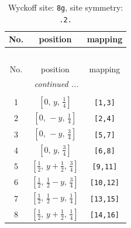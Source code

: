 \documentclass[fleqn,8pt]{jsarticle}
\begin{document}
\begin{longtable}{ccc}
\caption{Wyckoff site: {\tt 8g}, site symmetry: {\tt .2.}}
 \\
 \hline \hline
No. & position & mapping \\ \hline \endfirsthead

\multicolumn{2}{l}{\tablename\ \thetable{}} \\
 \hline \hline
No. & position & mapping \\ \hline \endhead

 \hline \hline
\multicolumn{2}{r}{\footnotesize\it continued ...} \\ \endfoot

 \hline \hline
\multicolumn{2}{r}{} \\ \endlastfoot

1 & $\left[ 0,\, y,\, \frac{1}{4} \right]$ & {\tt [1,3]} \\ \hline
2 & $\left[ 0,\, - y,\, \frac{1}{4} \right]$ & {\tt [2,4]} \\ \hline
3 & $\left[ 0,\, - y,\, \frac{3}{4} \right]$ & {\tt [5,7]} \\ \hline
4 & $\left[ 0,\, y,\, \frac{3}{4} \right]$ & {\tt [6,8]} \\ \hline
5 & $\left[ \frac{1}{2},\, y + \frac{1}{2},\, \frac{3}{4} \right]$ & {\tt [9,11]} \\ \hline
6 & $\left[ \frac{1}{2},\, \frac{1}{2} - y,\, \frac{3}{4} \right]$ & {\tt [10,12]} \\ \hline
7 & $\left[ \frac{1}{2},\, \frac{1}{2} - y,\, \frac{1}{4} \right]$ & {\tt [13,15]} \\ \hline
8 & $\left[ \frac{1}{2},\, y + \frac{1}{2},\, \frac{1}{4} \right]$ & {\tt [14,16]} \\
\end{longtable}
\renewcommand{\arraystretch}{1.2}
\end{document}
